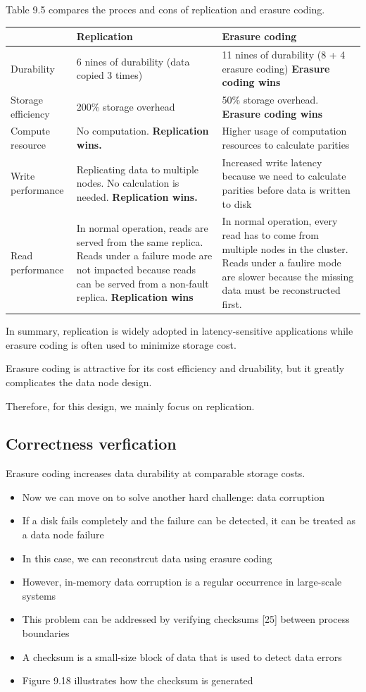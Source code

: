 \documentclass{report}
\theoremstyle{definition}
\let\oldsubsection\subsection
\renewcommand{\subsection}{\oldsubsection*}
\begin{document}
Table 9.5 compares the proces and cons of replication and erasure coding.

\begin{tabular}{|p{4cm}|p{4cm}|p{4cm}|}
\hline
      & \textbf{Replication} & \textbf{Erasure coding} \\
\hline
Durability & 6 nines of durability (data copied 3 times) & 11 nines of durability (8 + 4 erasure coding) \textbf{Erasure coding wins} \\
\hline
Storage efficiency & 200\% storage overhead & 50\% storage overhead. \textbf{Erasure coding wins} \\
\hline
Compute resource & No computation. \textbf{Replication wins.}
 & Higher usage of computation resources to calculate parities \\
\hline
Write performance & Replicating data to multiple nodes. No calculation is needed. \textbf{Replication wins.}
 & Increased write latency because we need to calculate parities before data is written to disk\\
\hline
Read performance & In normal operation, reads are served from the same replica. Reads under a failure mode are not impacted because reads can be served from a non-fault replica. \textbf{Replication wins}
 & In normal operation, every read has to come from multiple nodes in the cluster. Reads under a faulire mode are slower because the missing data must be reconstructed first.\\
\hline
\end{tabular}

In summary, replication is widely adopted in latency-sensitive applications while erasure coding is often used to minimize storage cost.

Erasure coding is attractive for its cost efficiency and druability, but it greatly complicates the data node design.

Therefore, for this design, we mainly focus on replication.

\subsection{Correctness verfication}

Erasure coding increases data durability at comparable storage costs.

\begin{itemize}
\item
Now we can move on to solve another hard challenge: data corruption
\item
If a disk fails completely and the failure can be detected, it can be treated as a data node failure
\item
In this case, we can reconstrcut data using erasure coding
\item
However, in-memory data corruption is a regular occurrence in large-scale systems
\item
This problem can be addressed by verifying checksums [25] between process boundaries
\item
A checksum is a small-size block of data that is used to detect data errors
\item
Figure 9.18 illustrates how the checksum is generated
\end{itemize}
\end{document}
